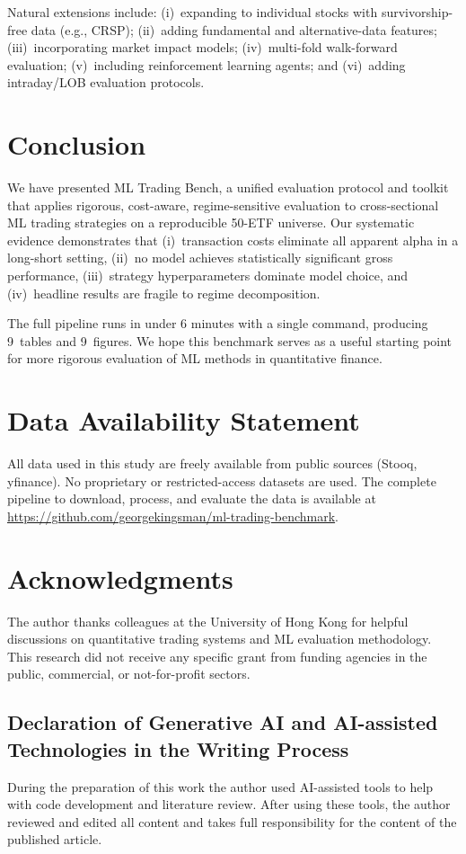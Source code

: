 \documentclass[11pt]{article}
\begin{document}
Natural extensions include:
(i)~expanding to individual stocks with survivorship-free data (e.g., CRSP);
(ii)~adding fundamental and alternative-data features;
(iii)~incorporating market impact models;
(iv)~multi-fold walk-forward evaluation;
(v)~including reinforcement learning agents;
and (vi)~adding intraday/LOB evaluation protocols.

\section{Conclusion}

We have presented ML Trading Bench, a unified evaluation protocol and toolkit that applies rigorous, cost-aware, regime-sensitive evaluation to cross-sectional ML trading strategies on a reproducible 50-ETF universe.
Our systematic evidence demonstrates that (i)~transaction costs eliminate all apparent alpha in a long-short setting, (ii)~no model achieves statistically significant gross performance, (iii)~strategy hyperparameters dominate model choice, and (iv)~headline results are fragile to regime decomposition.

The full pipeline runs in under 6 minutes with a single command, producing 9~tables and 9~figures.
We hope this benchmark serves as a useful starting point for more rigorous evaluation of ML methods in quantitative finance.


\section*{Data Availability Statement}

All data used in this study are freely available from public sources (Stooq, yfinance).
No proprietary or restricted-access datasets are used.
The complete pipeline to download, process, and evaluate the data is available at
\url{https://github.com/georgekingsman/ml-trading-benchmark}.


\section*{Acknowledgments}
The author thanks colleagues at the University of Hong Kong for helpful discussions on quantitative trading systems and ML evaluation methodology.
This research did not receive any specific grant from funding agencies in the public, commercial, or not-for-profit sectors.

\subsection*{Declaration of Generative AI and AI-assisted Technologies in the Writing Process}
During the preparation of this work the author used AI-assisted tools to help with code development and literature review. After using these tools, the author reviewed and edited all content and takes full responsibility for the content of the published article.



\end{document}
